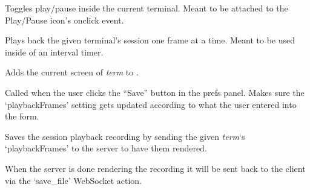 \documentclass[letterpaper,10pt,openany]{sphinxmanual}
\begin{document}

\begin{fulllineitems}
\label{Applications/terminal/plugin_playback:GateOne.Playback.playPauseControl}
Toggles play/pause inside the current terminal.  Meant to be attached to the Play/Pause icon's onclick event.

\end{fulllineitems}


\begin{fulllineitems}
\label{Applications/terminal/plugin_playback:GateOne.Playback.playbackRealtime}
Plays back the given terminal's session one frame at a time.  Meant to be used inside of an interval timer.

\end{fulllineitems}


\begin{fulllineitems}
\label{Applications/terminal/plugin_playback:GateOne.Playback.pushPlaybackFrame}
Adds the current screen of \emph{term} to .

\end{fulllineitems}


\begin{fulllineitems}
\label{Applications/terminal/plugin_playback:GateOne.Playback.savePrefsCallback}
Called when the user clicks the ``Save'' button in the prefs panel.  Makes sure the `playbackFrames' setting gets updated according to what the user entered into the form.

\end{fulllineitems}


\begin{fulllineitems}
\label{Applications/terminal/plugin_playback:GateOne.Playback.saveRecording}
Saves the session playback recording by sending the given \emph{term}`s `playbackFrames' to the server to have them rendered.

When the server is done rendering the recording it will be sent back to the client via the `save\_file' WebSocket action.

\end{fulllineitems}
\end{document}

